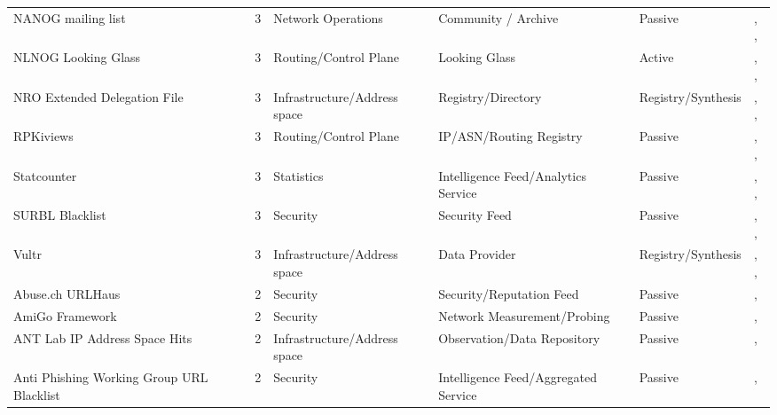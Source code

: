 \documentclass[11pt,a4paper]{article}
\begin{document}
\begin{longtable}{@{}p{}p{}p{}p{}p{}p{}p{}@{}}
NANOG mailing list & \cite{nanogmailinglist} & 3 & Network Operations & Community / Archive & Passive & \cite{10.1145/3487552.3487838}, \cite{10.1007/978-3-032-18268-5_5}, \cite{10.1145/3777912.3839829} \\
NLNOG Looking Glass & \cite{nlnoglg} & 3 & Routing/Control Plane & Looking Glass & Active & \cite{10.1145/3618257.3624838}, \cite{10.1145/3646547.3689008}, \cite{10.1145/3777912.3809149} \\
NRO Extended Delegation File & \cite{nro_delegation_file} & 3 & Infrastructure/Address space & Registry/Directory & Registry/Synthesis & \cite{10.1007/978-3-031-56249-5_8}, \cite{10.1007/978-3-031-56252-5_11}, \cite{10.1007/978-3-032-18268-5_14} \\
RPKiviews & \cite{rpki-views} & 3 & Routing/Control Plane & IP/ASN/Routing Registry & Passive & \cite{10.1145/3730567.3764485}, \cite{10.1145/3730567.3764452}, \cite{10.1007/978-3-031-28486-1_18} \\
Statcounter & \cite{statcounter} & 3 & Statistics & Intelligence Feed/Analytics Service & Passive & \cite{10.1145/3618257.3624842}, \cite{10.1145/3777912.3839824}, \cite{10.1145/3777912.3839815} \\
SURBL Blacklist & \cite{surbl} & 3 & Security & Security Feed & Passive & \cite{10.1145/3487552.3487857}, \cite{10.1007/978-3-030-98785-5_2}, \cite{10.1007/978-3-031-56249-5_9} \\
Vultr & \cite{vultr} & 3 & Infrastructure/Address space & Data Provider & Registry/Synthesis & \cite{10.1145/3730567.3764495}, \cite{10.1007/978-3-031-85960-1_16}, \cite{10.1145/3777912.3809144} \\
Abuse.ch URLHaus & \cite{abusech-urlhaus} & 2 & Security & Security/Reputation Feed & Passive & \cite{10.1145/3487552.3487857}, \cite{10.1007/978-3-031-56249-5_9} \\
AmiGo Framework & \cite{amigo-framework} & 2 & Security & Network Measurement/Probing & Passive & \cite{10.1145/3730567.3764491}, \cite{10.1145/3517745.3561442} \\
ANT Lab IP Address Space Hits & \cite{ant_lab_hits} & 2 & Infrastructure/Address space & Observation/Data Repository & Passive & \cite{10.1007/978-3-030-98785-5_9}, \cite{10.1007/978-3-032-18268-5_3} \\
Anti Phishing Working Group URL Blacklist & \cite{apwg-blacklist} & 2 & Security & Intelligence Feed/Aggregated Service & Passive & \cite{10.1007/978-3-031-28486-1_24}, \cite{10.1007/978-3-031-56249-5_9} \\

\end{longtable}
\end{document}
